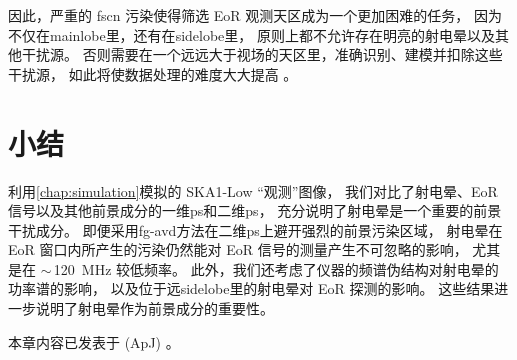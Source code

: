 因此，严重的 \ac{fscn} 污染使得筛选 EoR 观测天区成为一个更加困难的任务，
因为不仅在\ac{mainlobe}里，还有在\ac{sidelobe}里，
原则上都不允许存在明亮的射电晕以及其他干扰源。
否则需要在一个远远大于视场的天区里，准确识别、建模并扣除这些干扰源，
如此将使数据处理的难度大大提高 \cite{pober2013,pober2016}。


\section{小结}

利用\autoref{chap:simulation}模拟的 SKA1-Low \enquote{观测}图像，
我们对比了射电晕、EoR 信号以及其他前景成分的一维\ac{ps}和二维\ac{ps}，
充分说明了射电晕是一个重要的前景干扰成分。
即便采用\ac{fg-avd}方法在二维\ac{ps}上避开强烈的前景污染区域，
射电晕在 EoR 窗口内所产生的污染仍然能对 EoR 信号的测量产生不可忽略的影响，
尤其是在 $\sim$\,\SI{120}{\MHz} 较低频率。
此外，我们还考虑了仪器的频谱伪结构对射电晕的功率谱的影响，
以及位于远\ac{sidelobe}里的射电晕对 EoR 探测的影响。
这些结果进一步说明了射电晕作为前景成分的重要性。

本章内容已发表于 \apj{} (ApJ) \cite{li.halo}。


